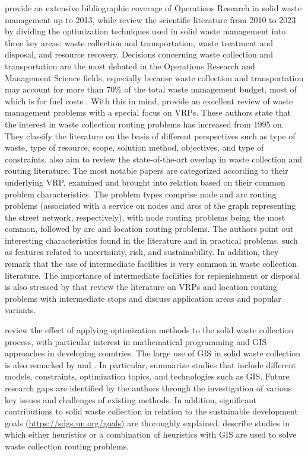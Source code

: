 \documentclass[preprint,11pt,authoryear]{elsarticle}
\begin{document}
\cite{Ghiani2014} provide an extensive bibliographic coverage of Operations Research in solid waste management up to 2013, while \cite{Alshaikh2024} review the scientific literature from 2010 to 2023 by dividing the optimization techniques used in solid waste management into three key areas: waste collection and transportation, waste treatment and disposal, and resource recovery. Decisions concerning waste collection and transportation are the most debated in the Operations Research and Management Science fields, especially because waste collection and transportation may account for more than 70\% of the total waste management budget, most of which is for fuel costs \citep{Tavares2009}.
%
With this in mind, \cite{Belien2014} provide an excellent review of waste management problems with a special focus on VRPs. These authors state that the interest in waste collection routing problems has increased from 1995 on. They classify the literature on the basis of different perspectives such as type of waste, type of resource, scope, solution method, objectives, and type of constraints. \cite{Hess2024} also aim to review the state-of-the-art overlap in waste collection and routing literature. The most notable papers are categorized according to their underlying VRP, examined and brought into relation based on their common problem characteristics. The problem types comprise node and arc routing problems (associated with a service on nodes and arcs of the graph representing the street network, respectively), with node routing problems being the most common, followed by arc and location routing problems. The authors point out interesting characteristics found in the literature and in practical problems, such as features related to uncertainty, risk, and sustainability. In addition, they remark that the use of intermediate facilities is very common in waste collection literature. The importance of intermediate facilities for replenishment or disposal is also stressed by \cite{Schiffer2019} that review the literature on VRPs and location routing problems with intermediate stops and discuss application areas and popular variants. 

\cite{Sulemana2018} review the effect of applying optimization methods to the solid waste collection process, with particular interest in mathematical programming and GIS approaches in developing countries. The large use of GIS in solid waste collection is also remarked by \cite{Hannan2020} and \cite{Liang2022}. In particular, \cite{Hannan2020} summarize studies that include different models, constraints, optimization topics, and technologies such as GIS. Future research gaps are identified by the authors through the investigation of various key issues and challenges of existing methods. In addition, significant contributions to solid waste collection in relation to the sustainable development goals (\url{https://sdgs.un.org/goals}) are thoroughly explained. \cite{Liang2022} describe studies in which either heuristics or a combination of heuristics with GIS are used to solve 
waste collection routing problems. 
\end{document}
